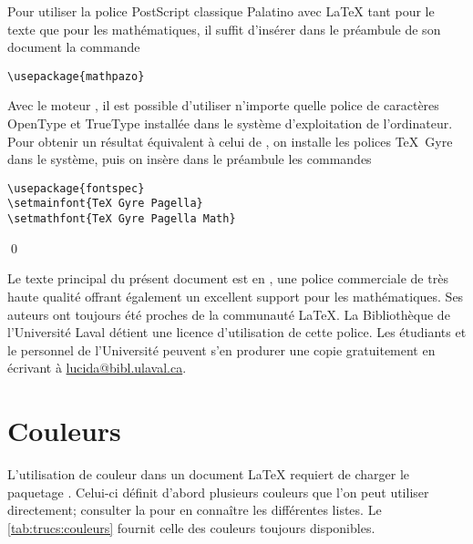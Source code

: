 \begin{exemple}
  \label{ex:trucs:palatino}
  Pour utiliser la police PostScript classique Palatino avec {\LaTeX}
  tant pour le texte que pour les mathématiques, il suffit d'insérer
  dans le préambule de son document la commande
\begin{lstlisting}
\usepackage{mathpazo}
\end{lstlisting}

  Avec le moteur {\XeLaTeX}, il est possible d'utiliser n'importe
  quelle police de caractères OpenType et TrueType installée dans le
  système d'exploitation de l'ordinateur. Pour obtenir un résultat
  équivalent à celui de , on installe les polices
  TeX~Gyre dans le système, puis on insère dans le préambule les
  commandes
\begin{lstlisting}
\usepackage{fontspec}
\setmainfont{TeX Gyre Pagella}
\setmathfont{TeX Gyre Pagella Math}
\end{lstlisting}
  \qed
\end{exemple}

Le texte principal du présent document est en %
, %
une police commerciale de très haute qualité offrant également un
excellent support pour les mathématiques. Ses auteurs ont toujours été
proches de la communauté {\LaTeX}. La Bibliothèque de l'Université
Laval détient une licence d'utilisation de cette police. Les étudiants
et le personnel de l'Université peuvent s'en produrer une copie
gratuitement en écrivant à
\href{mailto:lucida@bibl.ulaval.ca}{lucida@bibl.ulaval.ca}.



\section{Couleurs}
\label{sec:trucs:couleurs}

L'utilisation de couleur dans un document {\LaTeX} requiert de charger
le paquetage  \citep{xcolor}. Celui-ci définit d'abord
plusieurs couleurs que l'on peut utiliser directement; consulter la %
pour en connaître les différentes listes. Le
\autoref{tab:trucs:couleurs} fournit celle des couleurs toujours
disponibles.

